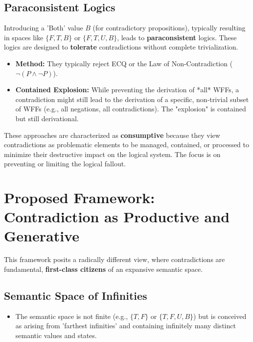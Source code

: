 \documentclass{article}
\begin{document}
	\subsection{Paraconsistent Logics}
	Introducing a 'Both' value $B$ (for contradictory propositions), typically resulting in spaces like $\{F, T, B\}$ or $\{F, T, U, B\}$, leads to \textbf{paraconsistent} logics. These logics are designed to \textbf{tolerate} contradictions without complete trivialization.
	\begin{itemize}
		\item \textbf{Method:} They typically reject ECQ or the Law of Non-Contradiction ($\neg(P \land \neg P)$).
		\item \textbf{Contained Explosion:} While preventing the derivation of *all* WFFs, a contradiction might still lead to the derivation of a specific, non-trivial subset of WFFs (e.g., all negations, all contradictions). The "explosion" is contained but still derivational.
	\end{itemize}
	
	These approaches are characterized as \textbf{consumptive} because they view contradictions as problematic elements to be managed, contained, or processed to minimize their destructive impact on the logical system. The focus is on preventing or limiting the logical fallout.
	
	\section{Proposed Framework: Contradiction as Productive and Generative}
	
	This framework posits a radically different view, where contradictions are fundamental, \textbf{first-class citizens} of an expansive semantic space.
	
	\subsection{Semantic Space of Infinities}
	\begin{itemize}
		\item The semantic space is not finite (e.g., $\{T, F\}$ or $\{T, F, U, B\}$) but is conceived as arising from 'farthest infinities' and containing infinitely many distinct semantic values and states.
	\end{itemize}
	
\end{document}
